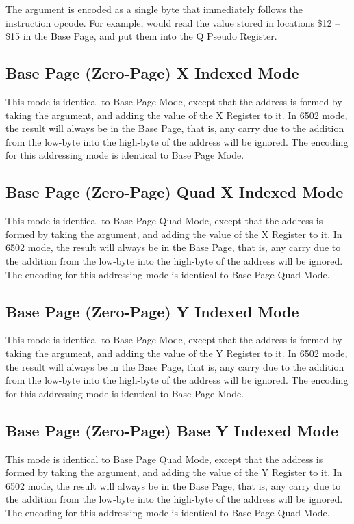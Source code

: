 The argument is encoded as a single byte that immediately follows the instruction opcode. For
example,  would read the value stored in locations \$12 -- \$15 in the Base Page,
and put them into the Q Pseudo Register.  

\subsection{Base Page (Zero-Page) X Indexed Mode}

This mode is identical to Base Page Mode, except that the address is formed by taking the
argument, and adding the value of the X Register to it.  In 6502 mode, the result will always
be in the Base Page, that is, any carry due to the addition from the low-byte into the high-byte
of the address will be ignored.  The encoding for this addressing mode is identical to Base Page
Mode.

\subsection{Base Page (Zero-Page) Quad X Indexed Mode}

This mode is identical to Base Page Quad Mode, except that the address is formed by taking the
argument, and adding the value of the X Register to it.  In 6502 mode, the result will always
be in the Base Page, that is, any carry due to the addition from the low-byte into the high-byte
of the address will be ignored.  The encoding for this addressing mode is identical to Base Page Quad
Mode.

\subsection{Base Page (Zero-Page) Y Indexed Mode}

This mode is identical to Base Page Mode, except that the address is formed by taking the
argument, and adding the value of the Y Register to it.  In 6502 mode, the result will always
be in the Base Page, that is, any carry due to the addition from the low-byte into the high-byte
of the address will be ignored.  The encoding for this addressing mode is identical to Base Page
Mode.

\subsection{Base Page (Zero-Page) Base Y Indexed Mode}

This mode is identical to Base Page Quad Mode, except that the address is formed by taking the
argument, and adding the value of the Y Register to it.  In 6502 mode, the result will always
be in the Base Page, that is, any carry due to the addition from the low-byte into the high-byte
of the address will be ignored.  The encoding for this addressing mode is identical to Base Page Quad
Mode.

